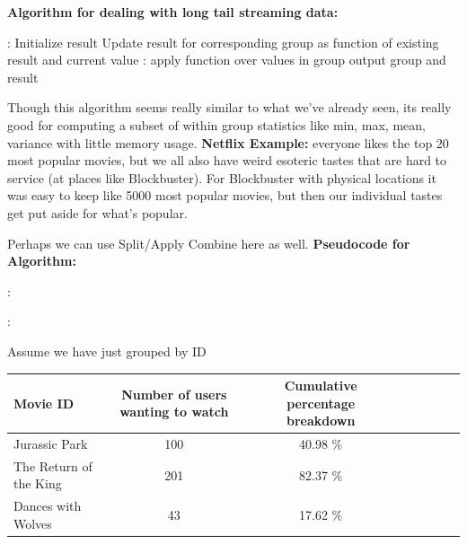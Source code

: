 \noindent \textbf{Algorithm for dealing with long tail streaming data:}
\begin{algorithmic}
	:
        	Initialize result
        \EndIf
        \State Update result for corresponding group as function of existing result and current value
    \EndFor
    :
    	\State apply function over values in group
        \State output group and result
	\EndFor
\end{algorithmic}
Though this algorithm seems really similar to what we've already seen, its really good for computing a subset of within group statistics like min, max, mean, variance with little memory usage.\newline
\textbf{Netflix Example:}
everyone likes the top 20 most popular movies, but we all also have weird esoteric tastes that are hard to service (at places like Blockbuster). For Blockbuster with physical locations it was easy to keep like 5000 most popular movies, but then our individual tastes get put aside for what's popular.

Perhaps we can use Split/Apply Combine here as well.\newline
\textbf{Pseudocode for Algorithm:}
\begin{algorithmic}
    
     \EndFunction
    
    :
        \EndFunction
	\EndFor 

    :
        \EndFunction
	\EndFor

\end{algorithmic}
Assume we have just grouped by ID
\newline
\newline
\begin{tabular}{l*{6}{c}r}
Movie ID          & Number of users wanting to watch & Cumulative percentage breakdown \\
\hline
Jurassic Park & 100 & 40.98 \%   \\
The Return of the King & 201 &  82.37 \% \\
Dances with Wolves    & 43 & 17.62 \%   \\
\end{tabular}

